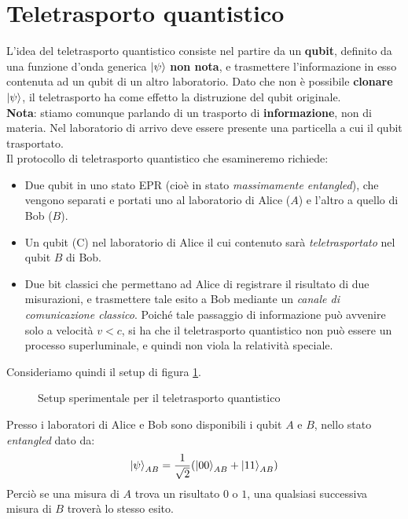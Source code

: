 \documentclass[../../InformazioneQuantistica.tex]{subfiles}
\begin{document}
\section{Teletrasporto quantistico}
L'idea del teletrasporto quantistico consiste nel partire da un \textbf{qubit}, definito da una funzione d'onda generica $\Ket{\psi}$ \textbf{non nota}, e trasmettere l'informazione in esso contenuta ad un qubit di un altro laboratorio. Dato che non è possibile \textbf{clonare} $\Ket{\psi}$, il teletrasporto ha come effetto la distruzione del qubit originale.\\
\textbf{Nota}: stiamo comunque parlando di un trasporto di \textbf{informazione}, non di materia. Nel laboratorio di arrivo deve essere presente una particella a cui  il qubit trasportato.\\

Il protocollo di teletrasporto quantistico che esamineremo richiede:
\begin{itemize}
\item Due qubit in uno stato EPR (cioè in stato \textit{massimamente entangled}), che vengono separati e portati uno al laboratorio di Alice ($A$) e l'altro a quello di Bob ($B$).
\item Un qubit (C) nel laboratorio di Alice il cui contenuto sarà \textit{teletrasportato} nel qubit $B$ di Bob.
\item Due bit classici che permettano ad Alice di registrare il risultato di due misurazioni, e trasmettere tale esito a Bob mediante un \textit{canale di comunicazione classico}. Poiché tale passaggio di informazione può avvenire solo a velocità $v < c$, si ha che il teletrasporto quantistico non può essere un processo superluminale, e quindi non viola la relatività speciale. 
\end{itemize}

Consideriamo quindi il setup di figura \ref{fig:setup-sperimentale}.

\begin{figure}[H]
\centering

\caption{Setup sperimentale per il teletrasporto quantistico
\label{fig:setup-sperimentale}}
\end{figure}

Presso i laboratori di Alice e Bob sono disponibili i qubit $A$ e $B$, nello stato \textit{entangled} dato da:
\begin{align*}
\Ket{\psi}_{AB} = \frac{1}{\sqrt{2}}(\Ket{00}_{AB} +\Ket{11}_{AB})
\end{align*}
Perciò se una misura di $A$ trova un risultato $0$ o $1$, una qualsiasi successiva misura di $B$ troverà lo stesso esito.\\
\end{document}
